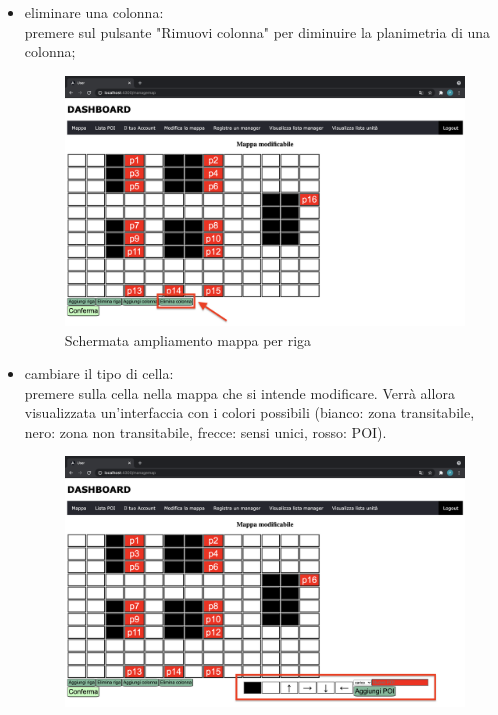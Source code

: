 \begin{itemize}
\begin{itemize}
\begin{figure}[H]
            \end{figure}
            \item eliminare una colonna: \\premere sul pulsante "Rimuovi colonna" per diminuire la planimetria di una colonna;
            \begin{figure}[H]
                \centering
                \includegraphics[scale=0.12]{res/images/modificamappa4.png}
                \caption{Schermata ampliamento mappa per riga}
            \end{figure}
            \item cambiare il tipo di cella: \\premere sulla cella nella mappa che si intende modificare. Verrà allora visualizzata un'interfaccia con i colori possibili (bianco: zona transitabile, nero: zona non transitabile, frecce: sensi unici, rosso: POI). 
            \begin{figure}[H]
                \centering
                \includegraphics[scale=0.12]{res/images/modificamappa5.png}

\end{figure}
\end{itemize}
\end{itemize}
